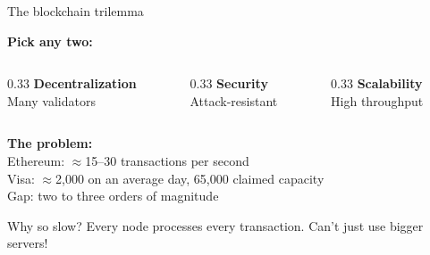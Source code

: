 \ifdefined\PRESENTATION\else\PassOptionsToClass{handout}{beamer}\fi\documentclass[aspectratio=169, lualatex]{beamer}
\begin{document}
\begin{frame}{The blockchain trilemma}
	\begin{center}
		\textbf{Pick any two:}
	\end{center}
	\begin{columns}[c]
		\begin{column}{0.33\textwidth}
			\centering
			\textbf{Decentralization}\\
			Many validators
		\end{column}
		\begin{column}{0.33\textwidth}
			\centering
			\textbf{Security}\\
			Attack-resistant
		\end{column}
		\begin{column}{0.33\textwidth}
			\centering
			\textbf{Scalability}\\
			High throughput
		\end{column}
	\end{columns}
	\vspace{1em}
	\begin{center}
		\textbf{The problem:}\\
		Ethereum: $\approx$15--30 transactions per second\\
		Visa: $\approx$2,000 on an average day, 65,000 claimed capacity\\
		Gap: two to three orders of magnitude
	\end{center}
	\begin{alertblock}{Why so slow?}
		Every node processes every transaction. Can't just use bigger servers!
	\end{alertblock}
\end{frame}
\end{document}
